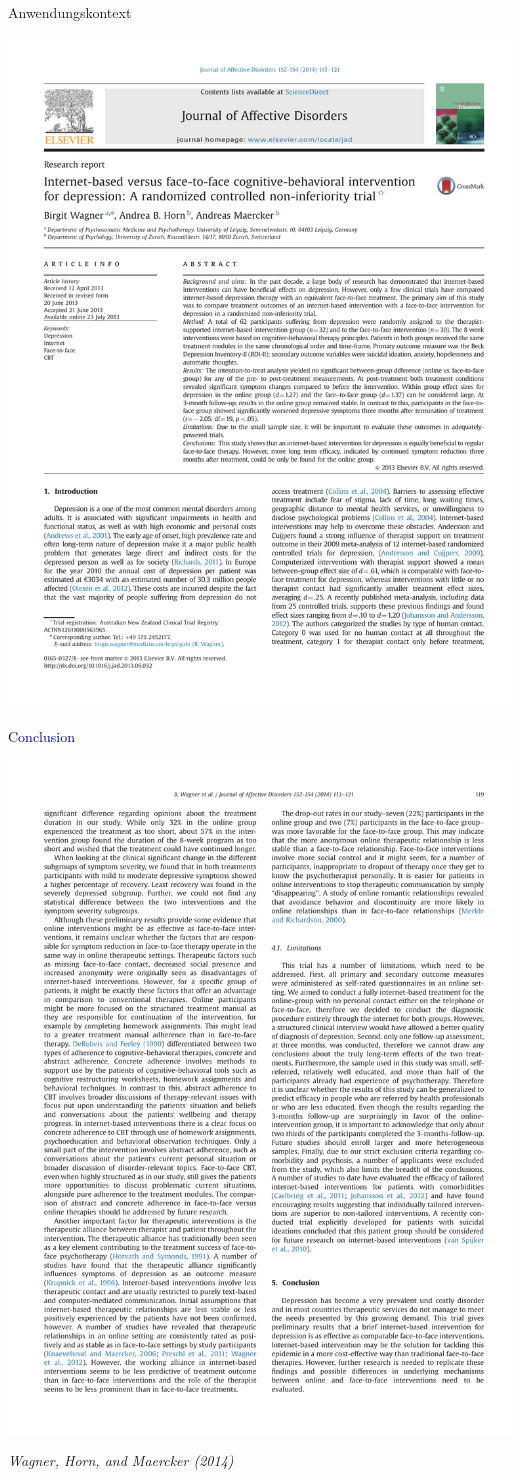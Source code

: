 \documentclass[
  8pt,
  ignorenonframetext,
]{beamer}
\begin{document}
\begin{frame}[t]{Anwendungskontext}
\protect\hypertarget{anwendungskontext-14}{}
\begin{center}\includegraphics[width=0.5\linewidth]{8_Abbildungen/alm_8_article_title} \end{center}
\center

\textcolor{darkblue}{Conclusion} \vspace{5mm}

\begin{center}\includegraphics[width=0.5\linewidth]{8_Abbildungen/alm_8_article_conclusion} \end{center}
\vfill
\flushright
\footnotesize

\emph{Wagner, Horn, and Maercker (2014)}
\end{frame}
\end{document}
